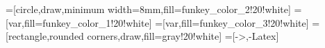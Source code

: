 \usetikzlibrary{arrows.meta}
\usetikzlibrary{backgrounds}
\usetikzlibrary{calc}
\usetikzlibrary{fit}
\pgfplotsset{compat=1.18}

=[circle,draw,minimum width=8mm,fill=funkey_color_2!20!white]
=[var,fill=funkey_color_1!20!white]
=[var,fill=funkey_color_3!20!white]
=[rectangle,rounded corners,draw,fill=gray!20!white]
=[->,-{Latex}]
